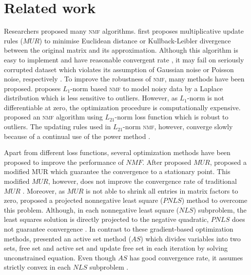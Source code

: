 \section{Related work}
Researchers proposed many \textsc{nmf} algorithms. \citet{lee2001algorithms} first proposes multiplicative update rules (${MUR}$) to minimise Euclidean distance or Kullback-Leibler divergence between the original matrix and its approximation. Although this algorithm is easy to implement and have reasonable convergent rate \citep{lee2001algorithms}, it may fail on seriously corrupted dataset which violates its assumption of Gaussian noise or Poisson noise, respectively \citep{guan2017truncated}.  To improve the robustness of \textsc{nmf}, many methods have been proposed. \citet{lam2008non} proposes ${L_1}$-norm based \textsc{nmf} to model noisy data by a Laplace distribution which is less sensitive to outliers. However, as $L_1$-norm is not differentiable at zero, the optimization procedure is computationally expensive. \citet{kong2011robust} proposed an \textsc{nmf} algorithm using $L_{21}$-norm loss function which is robust to outliers. The updating rules used in $L_{21}$-norm \textsc{nmf}, however, converge slowly because of a continual use of the power method \citep{guan2017truncated}.

Apart from different loss functions, several optimization methods have been proposed to improve the performance of ${NMF}$. After \citet{lee2001algorithms} proposed ${MUR}$, \citet{ lin2007convergence} proposed a modified MUR which guarantee the convergence to a stationary point. This modified ${MUR}$, however, does not improve the convergence rate of traditional ${MUR}$ \citet{guan2012nenmf}. Moreover, as ${MUR}$ is not able to shrink all entries in matrix factors to zero, \citet{berry2007algorithms} proposed a projected nonnegative least square (${PNLS}$) method to overcome this problem. Although, in each nonnegative least square (${NLS}$) subproblem, the least squares solution is directly projected to the negative quadratic, ${PNLS}$ does not guarantee convergence \citet{guan2012nenmf}. In contrast to these gradient-based optimization methods, \citet{kim2008nonnegative} presented an active set method (${AS}$) which divides variables into two sets, free set and active set and update free set in each iteration by solving unconstrained equation. Even though ${AS}$ has good convergence rate, it assumes strictly convex in each ${NLS}$ subproblem \citet{kim2008nonnegative}. 
